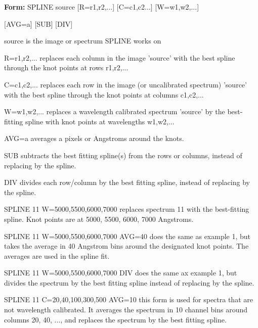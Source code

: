 {\newpage\clearpage
{}%
\begin{command}
  \item[\textbf{Form: } SPLINE source {[R=r1,r2,...]} {[C=c1,c2...]} 
       {[W=w1,w2,...]}\hfill]{}
  \item{{[AVG=a]} {[SUB]} {[DIV]}}
  \item[source]{is the image or spectrum SPLINE works on}
  \item[R=r1,r2,...]{replaces each column in the image 'source'
       with the best spline through the knot points at rows r1,r2,...}
  \item[C=c1,c2,...]{replaces each row in the image (or uncalibrated 
       spectrum) 'source' with the best spline 
       through the knot points at columns c1,c2,...}
  \item[W=w1,w2,...]{replaces a wavelength calibrated spectrum
       'source' by the best-fitting spline with knot
       points at wavelengths w1,w2,...}
  \item[AVG=a]{averages a pixels or Angstroms around the knots.}
  \item[SUB]{subtracts the best fitting spline(s) from the 
       rows or columns, instead of replacing by the spline.}
  \item[DIV]{divides each row/column by the best fitting
       spline, instead of replacing by the spline.}
\end{command}%
\lthtmlfigureZ
\lthtmlcheckvsize\clearpage}

{\newpage\clearpage
{}%
\begin{example}
  \item[SPLINE 11 W=5000,5500,6000,7000\hfill]{ replaces spectrum 11 with
       the best-fitting spline.  Knot points are at 5000, 5500, 6000, 7000
       Angstroms.}
\par\item[SPLINE 11 W=5000,5500,6000,7000 AVG=40\hfill]{ does the same as
       example 1, but takes the average in 40 Angstrom bins around the
       designated knot points.  The averages are used in the spline fit.}
\par\item[SPLINE 11 W=5000,5500,6000,7000 DIV\hfill]{ does the same ax
       example 1, but divides the spectrum by the best fitting spline
       instead of replacing by the spline.}
\par\item[SPLINE 11 C=20,40,100,300,500 AVG=10\hfill]{ this form is used for
       spectra that are not wavelength calibrated.  It averages the
       spectrum in 10 channel bins around columns 20, 40, ..., and replaces
       the spectrum by the best fitting spline.}
\end{example}%
\lthtmlfigureZ
\lthtmlcheckvsize\clearpage}

